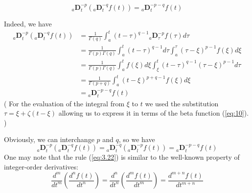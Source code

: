 \documentclass[a4paper,14pt,oneside]{book}
\theoremstyle{plain}
\theoremstyle{definition}
\theoremstyle{remark}
\begin{document}
\begin{center}
\begin{flushleft}
\begin{equation}\label{eq:3.21}
{ }_{a} \mathbf{D}_{t}^{-p}\left({ }_{a} \mathbf{D}_{t}^{-q} f(t)\right)={ }_{a} \mathbf{D}_{t}^{-p-q} f(t)
\end{equation}
\par Indeed, we have
$$
\begin{aligned}
{ }_{a} \mathbf{D}_{t}^{-p}\left({ }_{a} \mathbf{D}_{t}^{-q} f(t)\right) &=\frac{1}{\Gamma(q)} \int_{a}^{t}(t-\tau)^{q-1}{ }_{a} \mathbf{D}_{\tau}^{-p} f(\tau) d \tau \\
&=\frac{1}{\Gamma(p) \Gamma(q)} \int_{a}^{t}(t-\tau)^{q-1} d \tau \int_{a}^{\tau}(\tau-\xi)^{p-1} f(\xi) d \xi \\
&=\frac{1}{\Gamma(p) \Gamma(q)} \int_{a}^{t} f(\xi) d \xi \int_{\xi}^{t}(t-\tau)^{q-1}(\tau-\xi)^{p-1} d \tau \\
&=\frac{1}{\Gamma(p+q)} \int_{a}^{t}(t-\xi)^{p+q-1} f(\xi) d \xi \\
&={ }_{a} \mathbf{D}_{t}^{-p-q} f(t)
\end{aligned}
$$
( For the evaluation of the integral from $\xi$ to $t$ we used the substitution $\tau=\xi+\zeta(t-\xi)$ allowing us to express it in terms of the beta function (\ref{eq:10}). )
\par Obviously, we can interchange $p$ and $q$, so we have
\begin{equation}\label{eq:3.22}
{ }_{a} \mathbf{D}_{t}^{-p}\left({ }_{a} \mathbf{D}_{t}^{-q} f(t)\right)={ }_{a} \mathbf{D}_{t}^{-q}\left({ }_{a} \mathbf{D}_{l}^{-p} f(t)\right)={ }_{a} \mathbf{D}_{t}^{-p-q} f(t)
\end{equation}
One may note that the rule (\ref{eq:3.22}) is similar to the well-known property of integer-order derivatives:
\begin{equation}\label{eq:3.23}
\frac{d^{m}}{d t^{m}}\left(\frac{d^{n} f(t)}{d t^{n}}\right)=\frac{d^{n}}{d t^{n}}\left(\frac{d^{m} f(t)}{d t^{m}}\right)=\frac{d^{m+n} f(t)}{d t^{m+n}}
\end{equation}


\end{flushleft}
\end{center}
\end{document}
